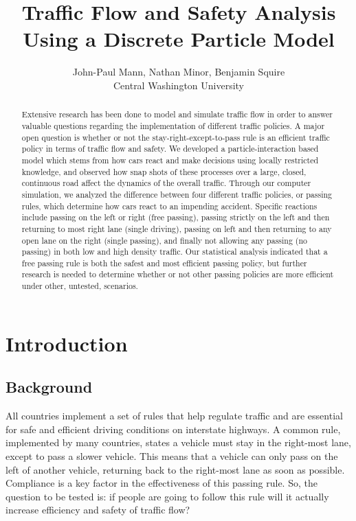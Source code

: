 \documentclass{amsart}
\title{Traffic Flow and Safety Analysis \\ Using a Discrete Particle Model}
\author{John-Paul Mann, Nathan Minor, Benjamin Squire \\ Central Washington University}
\begin{document}


\begin{abstract}
Extensive research has been done to model and simulate traffic flow in order to answer valuable questions regarding the implementation of different traffic policies. A major open question is whether or not the stay-right-except-to-pass rule is an efficient traffic policy in terms of traffic flow and safety.  We developed a particle-interaction based model which stems from how cars react and make decisions using locally restricted knowledge, and observed how snap shots of these processes over a large, closed, continuous road affect the dynamics of the overall traffic.  Through our computer simulation, we analyzed the difference between four different traffic policies, or passing rules, which determine how cars react to an impending accident. Specific reactions include passing on the left or right (free passing), passing strictly on the left and then returning to most right lane (single driving), passing on left and then returning to any open lane on the right (single passing), and finally not allowing any passing (no passing) in both low and high density traffic. Our statistical analysis indicated that a free passing rule is both the safest and most efficient passing policy, but further research is needed to determine whether or not other passing policies are more efficient under other, untested, scenarios.
\end{abstract}

\maketitle
\newpage


\tableofcontents
\newpage

\section{\bf{Introduction}}

	
	\subsection{Background}
		All countries implement a set of rules that help regulate traffic and are essential for safe and efficient driving conditions on interstate highways. A common rule, implemented by many countries, states a vehicle must stay in the right-most lane, except to pass a slower vehicle. This means that a vehicle can only pass on the left of another vehicle, returning back to the right-most lane as soon as possible. Compliance is a key factor in the effectiveness of this passing rule. So, the question to be tested is: if people are going to follow this rule will it actually increase efficiency and safety of traffic flow?
	
\end{document}
